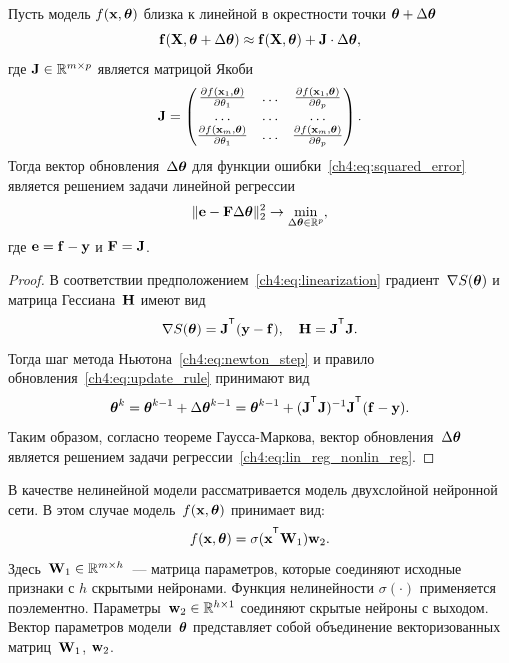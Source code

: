 \begin{theorem}
	Пусть модель $f (\mathbf{x} , \boldsymbol{\theta})$ близка к линейной в окрестности точки $\boldsymbol{\theta} + \Delta \boldsymbol{\theta}$
	\begin{equation}
		\mathbf{f}(\mathbf{X} , \boldsymbol{\theta} + \Delta \boldsymbol{\theta}) \approx \mathbf{f}(\mathbf{X} , \boldsymbol{\theta}) + \mathbf{J} \cdot \Delta  \boldsymbol{\theta},
		\label{ch4:eq:linearization}
	\end{equation}
	где $\mathbf{J} \in \mathbb{R}^{m \times p}$ является матрицой Якоби
	\begin{equation*}
		\mathbf{J} = 
		\begin{pmatrix}
			\frac{\partial f(\mathbf{x}_1 , \boldsymbol{\theta})}{\partial \theta_1} & \dots & 
			\frac{\partial f(\mathbf{x}_1 , \boldsymbol{\theta})}{\partial \theta_p} \\
			\dots & \dots & \dots \\
			\frac{\partial f(\mathbf{x}_m , \boldsymbol{\theta})}{\partial \theta_1} & \dots & 
			\frac{\partial f(\mathbf{x}_m , \boldsymbol{\theta})}{\partial \theta_p}
		\end{pmatrix}.
	\end{equation*}
	Тогда вектор обновления~$\Delta \boldsymbol{\theta}$ для функции ошибки~\eqref{ch4:eq:squared_error} является решением задачи линейной регрессии
	\begin{equation}
		\| \mathbf{e} - \mathbf{F} \Delta \boldsymbol{\theta} \|_2^2 \rightarrow \min_{\Delta \boldsymbol{\theta} \in \mathbb{R}^{p}},
		\label{ch4:eq:lin_reg_nonlin_reg}
	\end{equation}
	где $\mathbf{e} = \mathbf{f} - \mathbf{y}$ и $\mathbf{F} = \mathbf{J}$.
\end{theorem}
\begin{proof}
	В соответствии предположением~\eqref{ch4:eq:linearization} градиент~$\nabla S(\boldsymbol{\theta})$ и матрица Гессиана~$\mathbf{H}$ имеют вид
	\begin{equation}
		\nabla S(\btheta) = \bJ^{\T} (\by - \mathbf{f}), \quad \bH = \bJ^{\T} \bJ.
		\label{ch4:eq:nonlin_reg_deriv}
	\end{equation}
	Тогда шаг метода Ньютона~\eqref{ch4:eq:newton_step} и правило обновления~\eqref{ch4:eq:update_rule} принимают вид
	\[
		\btheta^k = \btheta^{k - 1} + \Delta \btheta^{k - 1} = \btheta^{k - 1} + (\bJ^{\T} \bJ)^{-1}\bJ^{\T}(\mathbf{f} - \by).
	\]
	Таким образом, согласно теореме Гаусса-Маркова, вектор обновления~$\Delta \boldsymbol{\theta}$ является решением задачи регрессии~\eqref{ch4:eq:lin_reg_nonlin_reg}.
\end{proof}
В качестве нелинейной модели рассматривается модель двухслойной нейронной сети. В этом случае модель~$f (\mathbf{x}, \boldsymbol{\theta})$ принимает вид:
\[
	f(\bx, \btheta) = \sigma(\bx^{\T} \bW_1) \bw_2.
\]
Здесь~$\mathbf{W}_1 \in \mathbb{R}^{m \times h}$~--- матрица параметров, которые соединяют исходные признаки с $h$ скрытыми нейронами. Функция нелинейности $\sigma(\cdot)$ применяется поэлементно. Параметры~$\mathbf{w}_2 \in \mathbb{R}^{h \times 1}$ соединяют скрытые нейроны с выходом. 
Вектор параметров модели~$\boldsymbol{\theta}$ представляет собой объединение векторизованных матриц~$\mathbf{W}_1$, $\mathbf{w}_2$.

